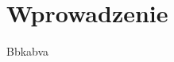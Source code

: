 \documentclass[12pt,twoside]{book}
\begin{document}
\setcounter{page}{1}
\thispagestyle{empty}


\tableofcontents

\chapter{Wprowadzenie}
\lipsum[1-4] %

Bbkabva \cite{przyklad2, przyklad1}



\end{document}
